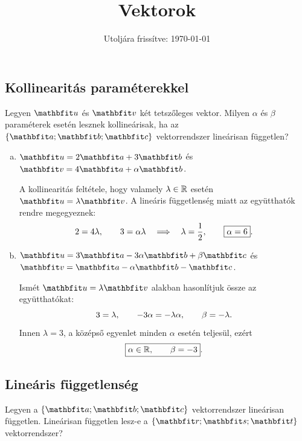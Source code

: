 \documentclass{szb-solution}
\title{Vektorok}
\date{Utoljára frissítve: \today}
\begin{document}
\maketitle

\subsection{Kollinearitás paraméterekkel}

Legyen $\rvec u$ és $\rvec v$ két tetszőleges vektor. Milyen $\alpha$ és
$\beta$ paraméterek esetén lesznek kollineárisak, ha az
$\{\rvec a;\rvec b;\rvec c\}$ vektorrendszer lineárisan független?

\begin{enumerate}[a)]
  \item
        $\rvec u=2\rvec a+3\rvec b$ és
        $\rvec v=4\rvec a+\alpha\rvec b$.

        A kollinearitás feltétele, hogy valamely $\lambda\in\mathbb{R}$ esetén
        $\rvec u=\lambda\rvec v$. A lineáris függetlenség miatt az együtthatók
        rendre megegyeznek:
        $$
          2=4\lambda,
          \qquad
          3=\alpha\lambda
          \quad\Longrightarrow\quad
          \lambda=\frac12,
          \qquad
          \boxed{\alpha=6}
          \text.
        $$

  \item
        $\rvec u=3\rvec a-3\alpha\rvec b+\beta\rvec c$ és
        $\rvec v=\rvec a-\alpha\rvec b-\rvec c$.

        Ismét $\rvec u=\lambda\rvec v$ alakban hasonlítjuk össze az
        együtthatókat:
        $$
          3=\lambda,
          \qquad
          -3\alpha=-\lambda\alpha,
          \qquad
          \beta=-\lambda
          \text.
        $$
        Innen $\lambda=3$, a középső egyenlet minden $\alpha$ esetén teljesül,
        ezért
        $$
          \boxed{\alpha\in\mathbb{R},
          \qquad
          \beta=-3}
          \text.
        $$
\end{enumerate}

\subsection{Lineáris függetlenség}

Legyen a $\{\rvec a;\rvec b;\rvec c\}$ vektorrendszer lineárisan független.
Lineárisan független lesz-e a $\{\rvec r;\rvec s;\rvec t\}$ vektorrendszer?
\end{document}
